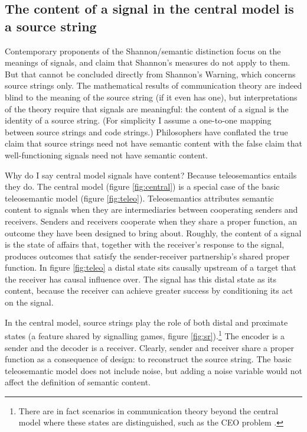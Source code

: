 \subsection{The content of a signal in the central model is a source string}\label{subsec:signalContent}

Contemporary proponents of the Shannon/semantic distinction focus on the meanings of signals, and claim that Shannon's measures do not apply to them.
But that cannot be concluded directly from {\sc Shannon's Warning}, which concerns source strings only.
The mathematical results of communication theory are indeed blind to the meaning of the source string (if it even has one), but interpretations of the theory require that signals are meaningful: the content of a signal is the identity of a source string.
(For simplicity I assume a one-to-one mapping between source strings and code strings.)
Philosophers have conflated the true claim that source strings need not have semantic content with the false claim that well-functioning signals need not have semantic content.

Why do I say central model signals have content?
Because teleosemantics entails they do.
The central model (figure \ref{fig:central}) is a special case of the basic teleosemantic model (figure \ref{fig:teleo}).
Teleosemantics attributes semantic content to signals when they are intermediaries between cooperating senders and receivers.
Senders and receivers cooperate when they share a proper function, an outcome they have been designed to bring about.
Roughly, the content of a signal is the state of affairs that, together with the receiver's response to the signal, produces outcomes that satisfy the sender-receiver partnership's shared proper function.
In figure \ref{fig:teleo} a distal state sits causally upstream of a target that the receiver has causal influence over.
The signal has this distal state as its content, because the receiver can achieve greater success by conditioning its act on the signal.



In the central model, source strings play the role of both distal and proximate states (a feature shared by signalling games, figure \ref{fig:sr}).\footnote{There are in fact scenarios in communication theory beyond the central model where these states are distinguished, such as the CEO problem \citep{berger1996ceo}.}
The encoder is a sender and the decoder is a receiver.
Clearly, sender and receiver share a proper function as a consequence of design: to reconstruct the source string.
The basic teleosemantic model does not include noise, but adding a noise variable would not affect the definition of semantic content.

